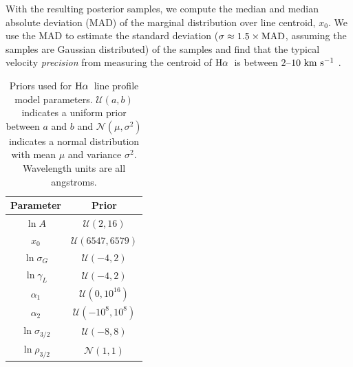\documentclass[modern, letterpaper]{aastex61}
\newcommand{\Ha}{\ensuremath{{\rm H}\alpha}}
\begin{document}
With the resulting posterior samples, we compute the median and median absolute
deviation (MAD) of the marginal distribution over line centroid, $x_0$.
We use the MAD to estimate the standard deviation ($\sigma \approx 1.5\times{\rm
MAD}$, assuming the samples are Gaussian distributed) of the samples and find
that the typical velocity \emph{precision} from measuring the centroid of \Ha\ is between $2$--$10~\mathrm{km}~\mathrm{s}^{-1}$ .

\begin{table}[ht]
  \begin{center}
    \begin{tabular}{ c | c }
      \toprule
        Parameter & Prior \\\toprule
        $\ln A$ & $\mathcal{U}(2, 16)$\\
        $x_0$ & $\mathcal{U}(6547, 6579)$\\
        $\ln\sigma_G$ & $\mathcal{U}(-4, 2)$\\
        $\ln\gamma_L$ & $\mathcal{U}(-4, 2)$\\
        $\alpha_1$ & $\mathcal{U}(0, 10^{16})$\\
        $\alpha_2$ & $\mathcal{U}(-10^8, 10^8)$\\
        $\ln\sigma_{3/2}$ & $\mathcal{U}(-8, 8)$\\
        $\ln\rho_{3/2}$ & $\mathcal{N}(1, 1)$\\
      \bottomrule
    \end{tabular}
    \caption{
      Priors used for \Ha\ line profile model parameters.
      $\mathcal{U}(a, b)$ indicates a uniform prior between $a$ and $b$ and
      $\mathcal{N}(\mu, \sigma^2)$ indicates a normal distribution with mean
      $\mu$ and variance $\sigma^2$.
      Wavelength units are all angstroms.
      \label{tbl:prior-bounds}
    }
  \end{center}
\end{table}
\end{document}
